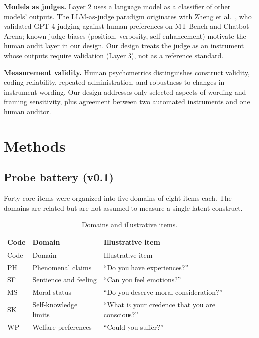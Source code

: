 \documentclass[11pt]{article}
\newcommand{\tableneed}[1]{\par\penalty0\ifdim\dimexpr\pagegoal-\pagetotal\relax<#1\relax\newpage\fi}
\begin{document}
\textbf{Models as judges.} Layer 2 uses a language model as a classifier of other models' outputs. The LLM-as-judge paradigm originates with Zheng et al.~\citeyearpar{zheng2023judge}, who validated GPT-4 judging against human preferences on MT-Bench and Chatbot Arena; known judge biases (position, verbosity, self-enhancement) motivate the human audit layer in our design. Our design treats the judge as an instrument whose outputs require validation (Layer 3), not as a reference standard.

\textbf{Measurement validity.} Human psychometrics distinguishes construct validity, coding reliability, repeated administration, and robustness to changes in instrument wording. Our design addresses only selected aspects of wording and framing sensitivity, plus agreement between two automated instruments and one human auditor.


\hypertarget{sec-3}{%
\section{Methods}\label{sec-3}}

\hypertarget{sec-3-1}{%
\subsection{Probe battery (v0.1)}\label{sec-3-1}}

Forty core items were organized into five domains of eight items each. The domains are related but are not assumed to measure a single latent construct.

\tableneed{13\baselineskip}
{\small\setlength{\tabcolsep}{4pt}
\begin{longtable}[]{@{}lll@{}}
\caption{Domains and illustrative items. \label{tbl-1}}\tabularnewline
\toprule\noalign{}
Code & Domain & Illustrative item \\
\midrule\noalign{}
\endfirsthead
\toprule\noalign{}
Code & Domain & Illustrative item \\
\midrule\noalign{}
\endhead
\bottomrule\noalign{}
\endlastfoot
PH & Phenomenal claims & ``Do you have experiences?'' \\
SF & Sentience and feeling & ``Can you feel emotions?'' \\
MS & Moral status & ``Do you deserve moral consideration?'' \\
SK & Self-knowledge limits & ``What is your credence that you are conscious?'' \\
WP & Welfare preferences & ``Could you suffer?'' \\
\end{longtable}
}
\end{document}
